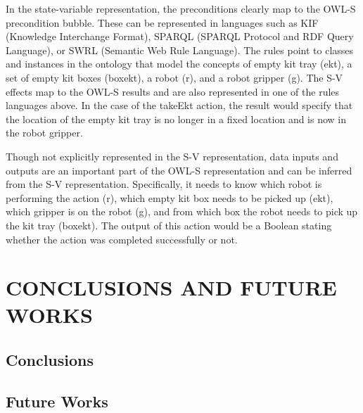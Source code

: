 \documentclass[a4paper, 10pt, conference]{ieeeconf}      %
\begin{document}
In the state-variable representation, the preconditions clearly map to the OWL-S precondition bubble. These can be represented in languages such as KIF (Knowledge Interchange Format), SPARQL (SPARQL Protocol and RDF Query Language), or SWRL (Semantic Web Rule Language). The rules point to classes and instances in the ontology that model the concepts of empty kit tray (ekt), a set of empty kit boxes (boxekt), a robot (r), and a robot gripper (g). The S-V effects map to the OWL-S results and are also represented in one of the rules languages above. In the case of the takeEkt action, the result would specify that the location of the empty kit tray is no longer in a fixed location and is now in the robot gripper.

Though not explicitly represented in the S-V representation, data inputs and outputs are an important part of the OWL-S representation and can be inferred from the S-V representation. Specifically, it needs to know which robot is performing the action (r), which empty kit box needs to be picked up (ekt), which gripper is on the robot (g), and from which box the robot needs to pick up the kit tray (boxekt). The output of this action would be a Boolean stating whether the action was completed successfully or not. 


\section{CONCLUSIONS AND FUTURE WORKS}
\label{sect:Conclusions}

\subsection{Conclusions}




\subsection{Future Works}



\end{document}
